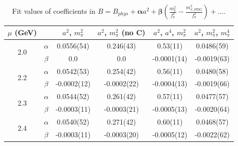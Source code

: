 \documentclass[12pt]{extarticle}
\begin{document}
\begin{table}[h!]
\begin{center}
\begin{tabular}{|c c|c|c|c|c|}
\hline
$\mu$ (GeV) &  & $a^2$, $m_\pi^2$& $a^2$, $m_\pi^2$ (no C)& $a^2$, $a^4$, $m_\pi^2$& $a^2$, $m_\pi^2$, $m_\pi^4$\\
\hline
\multirow{2}{0.5in}{2.0} & $\alpha$ & 0.0556(54)& 0.246(43)& 0.53(11)& 0.0486(59)\\
 & $\beta$ & 0.0& 0.0& -0.0001(14)& -0.0019(63)\\
\hline
\multirow{2}{0.5in}{2.2} & $\alpha$ & 0.0542(53)& 0.254(42)& 0.56(11)& 0.0480(58)\\
 & $\beta$ & -0.0002(12)& -0.0002(22)& -0.0004(13)& -0.0019(66)\\
\hline
\multirow{2}{0.5in}{2.3} & $\alpha$ & 0.0544(52)& 0.261(42)& 0.57(11)& 0.0477(57)\\
 & $\beta$ & -0.0003(11)& -0.0003(21)& -0.0005(13)& -0.0020(64)\\
\hline
\multirow{2}{0.5in}{2.4} & $\alpha$ & 0.0540(52)& 0.271(42)& 0.60(11)& 0.0468(57)\\
 & $\beta$ & -0.0003(11)& -0.0003(20)& -0.0005(12)& -0.0022(62)\\
\hline
\end{tabular}
\caption{Fit values of coefficients in $B = B_{phys} + \mathbf{\alpha} a^2 + \mathbf{\beta}\left(\frac{m_\pi^2}{f_\pi^2}-\frac{m_{\pi,PDG}^2}{f_\pi^2}\right) + \ldots$.}
\end{center}
\end{table}
















\clearpage
\end{document}
